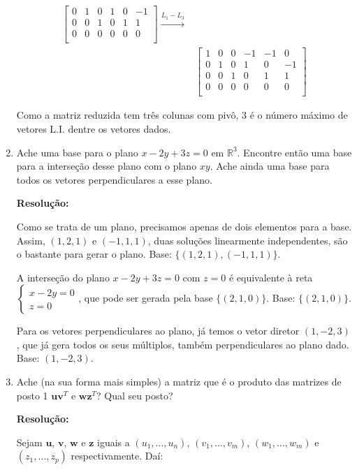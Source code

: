 \documentclass[leqno]{article}
\begin{document}
\begin{enumerate}
\begin{align*}
\begin{bmatrix}
        0 & 1 & 0 & 1 & 0 & -1\\
        0 & 0 & 1 & 0 & 1 & 1\\
        0 & 0 & 0 & 0 & 0 & 0\\
        \end{bmatrix}\xrightarrow{L_1-L_3}\\&\begin{bmatrix}
        1 & 0 & 0 & -1 & -1 & 0\\
        0 & 1 & 0 & 1 & 0 & -1\\
        0 & 0 & 1 & 0 & 1 & 1\\
        0 & 0 & 0 & 0 & 0 & 0\\
        \end{bmatrix}
    \end{align*}
    
    Como a matriz reduzida tem três colunas com pivô, $3$ é o número máximo de vetores L.I. dentre os vetores dados.
    
    \item Ache uma base para o plano $x-2y+3z=0$ em $\mathbb{R}^3$. Encontre então uma base para a interseção desse plano com o plano $xy$. Ache ainda uma base para todos os vetores perpendiculares a esse plano.
    
    \textbf{Resolução:}
    
    Como se trata de um plano, precisamos apenas de dois elementos para a base. Assim, $(1,2,1)$ e $(-1,1,1)$, duas soluções linearmente independentes, são o bastante para gerar o plano. Base: $\{(1,2,1),(-1,1,1)\}$.
    
    A interseção do plano $x-2y+3z=0$ com $z=0$ é equivalente à reta $\begin{cases}x-2y=0\\z=0\end{cases}$, que pode ser gerada pela base $\{(2,1,0)\}$. Base: $\{(2,1,0)\}$.
    
    Para os vetores perpendiculares ao plano, já temos o vetor diretor $(1,-2,3)$, que já gera todos os seus múltiplos, também perpendiculares ao plano dado. Base: $(1,-2,3)$.
    
    \item Ache (na sua forma mais simples) a matriz que é o produto das matrizes de posto 1 $\textbf{u}\textbf{v}^T$ e $\textbf{w}\textbf{z}^T$? Qual seu posto?
    
    \textbf{Resolução:}
    
    Sejam $\textbf{u}$, $\textbf{v}$, $\textbf{w}$ e $\textbf{z}$ iguais a $(u_1,\dots, u_n)$, $(v_1,\dots, v_m)$, $(w_1,\dots,w_m)$ e $(z_1,\dots,z_p)$ respectivamente. Daí:
    

\end{enumerate}
\end{document}
